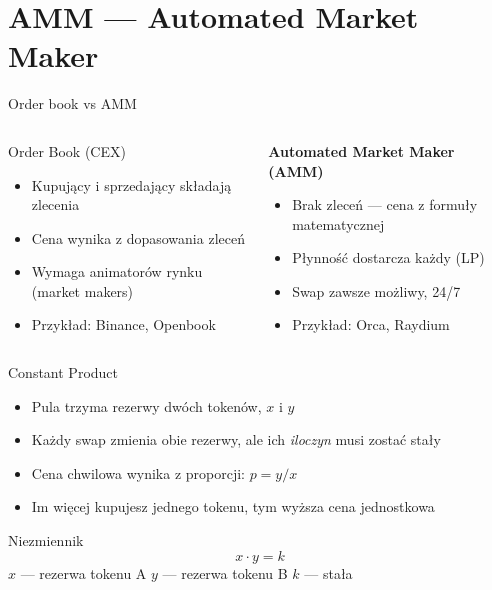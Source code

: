\section{AMM --- Automated Market Maker}

\begin{frame}{Order book vs AMM}
  \begin{columns}
      \begin{block}{Order Book (CEX)}
        \begin{itemize}
          \item Kupujący i sprzedający składają zlecenia
          \item Cena wynika z dopasowania zleceń
          \item Wymaga animatorów rynku (market makers)
          \item Przykład: Binance, Openbook
        \end{itemize}
      \end{block}

      \begin{block}{\textbf{Automated Market Maker (AMM)}}
        \begin{itemize}
          \item Brak zleceń --- cena z formuły matematycznej
          \item Płynność dostarcza każdy (LP)
          \item Swap zawsze możliwy, 24/7
          \item Przykład: Orca, Raydium
        \end{itemize}
      \end{block}
  \end{columns}
\end{frame}

\begin{frame}{Constant Product}
  \begin{itemize}
    \item Pula trzyma rezerwy dwóch tokenów, $x$ i $y$
    \item Każdy swap zmienia obie rezerwy, ale ich \emph{iloczyn} musi zostać stały
    \item Cena chwilowa wynika z proporcji: $p = y / x$
    \item Im więcej kupujesz jednego tokenu, tym wyższa cena jednostkowa
  \end{itemize}
  \vspace{0.3cm}
  \begin{block}{Niezmiennik}
    \[
      x \cdot y = k
    \]
    $x$ --- rezerwa tokenu A \quad $y$ --- rezerwa tokenu B \quad $k$ --- stała
  \end{block}
\end{frame}

